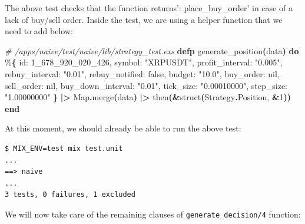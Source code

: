 \documentclass[
  oneside]{book}
\newenvironment{Shaded}{\begin{snugshade}}{\end{snugshade}}
\newcommand{\CommentTok}[1]{\textcolor[rgb]{0.56,0.35,0.01}{\textit{#1}}}
\newcommand{\ConstantTok}[1]{\textcolor[rgb]{0.56,0.35,0.01}{#1}}
\newcommand{\DecValTok}[1]{\textcolor[rgb]{0.00,0.00,0.81}{#1}}
\newcommand{\FunctionTok}[1]{\textcolor[rgb]{0.13,0.29,0.53}{\textbf{#1}}}
\newcommand{\KeywordTok}[1]{\textcolor[rgb]{0.13,0.29,0.53}{\textbf{#1}}}
\newcommand{\NormalTok}[1]{#1}
\newcommand{\OperatorTok}[1]{\textcolor[rgb]{0.81,0.36,0.00}{\textbf{#1}}}
\newcommand{\StringTok}[1]{\textcolor[rgb]{0.31,0.60,0.02}{#1}}
\newcommand{\VariableTok}[1]{\textcolor[rgb]{0.00,0.00,0.00}{#1}}
\begin{document}
The above test checks that the function returns': place\_buy\_order' in case of a lack of buy/sell order. Inside the test, we are using a helper function that we need to add below:

\begin{Shaded}
\begin{Highlighting}[]
  \CommentTok{\# /apps/naive/test/naive/lib/strategy\_test.exs}
  \KeywordTok{defp}\NormalTok{ generate\_position}\FunctionTok{(}\NormalTok{data}\FunctionTok{)} \KeywordTok{do}
\NormalTok{    \%}\FunctionTok{\{}
      \VariableTok{id:} \DecValTok{1\_678\_920\_020\_426}\NormalTok{,}
      \VariableTok{symbol:} \StringTok{"XRPUSDT"}\NormalTok{,}
      \VariableTok{profit\_interval:} \StringTok{"0.005"}\NormalTok{,}
      \VariableTok{rebuy\_interval:} \StringTok{"0.01"}\NormalTok{,}
      \VariableTok{rebuy\_notified:} \ConstantTok{false}\NormalTok{,}
      \VariableTok{budget:} \StringTok{"10.0"}\NormalTok{,}
      \VariableTok{buy\_order:} \ConstantTok{nil}\NormalTok{,}
      \VariableTok{sell\_order:} \ConstantTok{nil}\NormalTok{,}
      \VariableTok{buy\_down\_interval:} \StringTok{"0.01"}\NormalTok{,}
      \VariableTok{tick\_size:} \StringTok{"0.00010000"}\NormalTok{,}
      \VariableTok{step\_size:} \StringTok{"1.00000000"}
    \FunctionTok{\}}
    \OperatorTok{|\textgreater{}} \ConstantTok{Map}\OperatorTok{.}\NormalTok{merge}\FunctionTok{(}\NormalTok{data}\FunctionTok{)}
    \OperatorTok{|\textgreater{}}\NormalTok{ then}\FunctionTok{(}\OperatorTok{\&}\NormalTok{struct}\FunctionTok{(}\ConstantTok{Strategy}\OperatorTok{.}\ConstantTok{Position}\NormalTok{, }\OperatorTok{\&}\DecValTok{1}\FunctionTok{))}
  \KeywordTok{end}
\end{Highlighting}
\end{Shaded}

At this moment, we should already be able to run the above test:

\begin{verbatim}
$ MIX_ENV=test mix test.unit
...
==> naive
...
3 tests, 0 failures, 1 excluded
\end{verbatim}

We will now take care of the remaining clauses of \texttt{generate\_decision/4} function:
\end{document}
